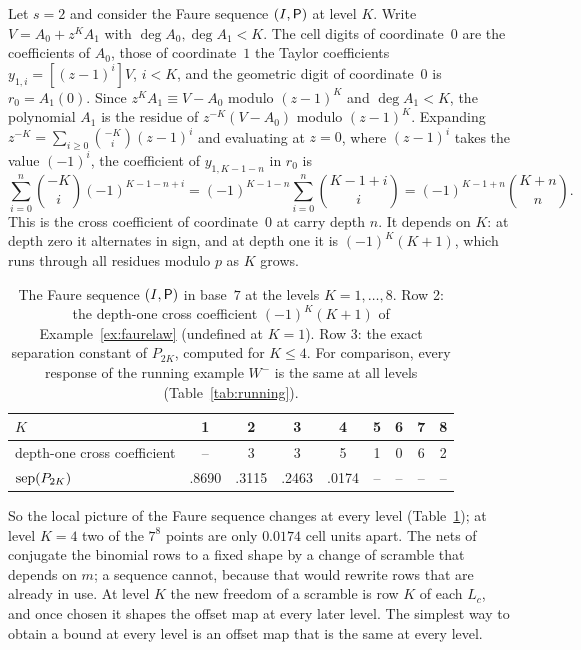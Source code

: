 \begin{example}\label{ex:faurelaw}
Let $s=2$ and consider the Faure sequence $(I,\mathsf{P})$ at level $K$. Write $V=A_0+z^KA_1$ with $\deg A_0,\deg A_1<K$. The cell digits of coordinate~$0$ are the coefficients of $A_0$, those of coordinate~$1$ the Taylor coefficients $y_{1,i}=[(z-1)^i]V$, $i<K$, and the geometric digit of coordinate~$0$ is $r_0=A_1(0)$. Since $z^KA_1\equiv V-A_0$ modulo $(z-1)^K$ and $\deg A_1<K$, the polynomial $A_1$ is the residue of $z^{-K}(V-A_0)$ modulo $(z-1)^K$. Expanding $z^{-K}=\sum_{i\ge0}\binom{-K}{i}(z-1)^i$ and evaluating at $z=0$, where $(z-1)^i$ takes the value $(-1)^i$, the coefficient of $y_{1,K-1-n}$ in $r_0$ is
\[
\sum_{i=0}^{n}\binom{-K}{i}(-1)^{K-1-n+i}=(-1)^{K-1-n}\sum_{i=0}^{n}\binom{K-1+i}{i}=(-1)^{K-1+n}\binom{K+n}{n}.
\]
This is the cross coefficient of coordinate~$0$ at carry depth $n$. It depends on $K$: at depth zero it alternates in sign, and at depth one it is $(-1)^K(K+1)$, which runs through all residues modulo $p$ as $K$ grows.
\end{example}

\begin{table}[t]
\centering
\small
\caption{The Faure sequence $(I,\mathsf{P})$ in base~$7$ at the levels $K=1,\dots,8$. Row 2: the depth-one cross coefficient $(-1)^K(K+1)$ of Example~\ref{ex:faurelaw} (undefined at $K=1$). Row 3: the exact separation constant of $P_{2K}$, computed for $K\le4$. For comparison, every response of the running example $W^-$ is the same at all levels (Table~\ref{tab:running}).}
\label{tab:faure}
\begin{tabular}{@{}l*{8}{c}@{}}
\toprule
$K$ & 1 & 2 & 3 & 4 & 5 & 6 & 7 & 8\\
\midrule
depth-one cross coefficient & -- & 3 & 3 & 5 & 1 & 0 & 6 & 2\\
$\operatorname{sep}(P_{2K})$ & .8690 & .3115 & .2463 & .0174 & -- & -- & -- & --\\
\bottomrule
\end{tabular}
\end{table}

So the local picture of the Faure sequence changes at every level (Table~\ref{tab:faure}); at level $K=4$ two of the $7^8$ points are only $0.0174$ cell units apart. The nets of \cite{Gru26geo} conjugate the binomial rows to a fixed shape by a change of scramble that depends on $m$; a sequence cannot, because that would rewrite rows that are already in use. At level $K$ the new freedom of a scramble is row $K$ of each $L_c$, and once chosen it shapes the offset map at every later level. The simplest way to obtain a bound at every level is an offset map that is the same at every level.

